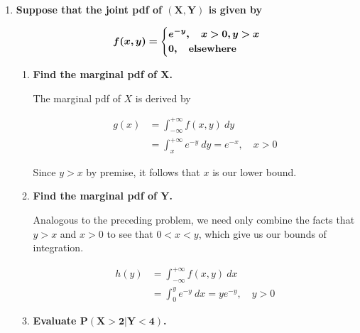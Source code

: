\documentclass[10pt, oneside]{article}
\begin{document}
\begin{enumerate}[label=6.\arabic*]
\item  \begin{tcolorbox}[
  colback=Cerulean!5!white,
  colframe=Cerulean!75!black]
\textbf{Suppose that the joint pdf of $\bm{(X, Y)}$ is given by}

\[ \bm{f(x,y) =} 
\begin{dcases}
\bm{e^{-y},} \quad \bm{x > 0, y > x} \\
\bm{0,} \quad \textbf{elsewhere}
\end{dcases}
\]
\end{tcolorbox}

\begin{enumerate}
	\item  \begin{tcolorbox}[
	  colback=Cerulean!5!white,
	  colframe=Cerulean!75!black]
	\textbf{Find the marginal pdf of $\bm{X}$.}
	\end{tcolorbox}
	
	The marginal pdf of $X$ is derived by
	
	\begin{align*}
	g(x) &= \int^{+\infty}_{-\infty} f(x,y) \ dy \\
	&= \int^{+\infty}_x e^{-y} \ dy = \boxed{e^{-x}, \quad x > 0}
	\end{align*}
	
	Since $y > x$ by premise, it follows that $x$ is our lower bound.
		
	\item  \begin{tcolorbox}[
	  colback=Cerulean!5!white,
	  colframe=Cerulean!75!black]
	\textbf{Find the marginal pdf of $\bm{Y}$.}
	\end{tcolorbox}
	
	Analogous to the preceding problem, we need only combine the facts that $y > x$ and $x > 0$ to see that $0 < x < y$, which give us our bounds of integration.
	
	\begin{align*}
	h(y) &= \int^{+\infty}_{-\infty} f(x,y) \ dx \\
	&= \int^y_0 e^{-y} \ dx = \boxed{y e^{-y}, \quad y > 0}
	\end{align*}
	
	\item  \begin{tcolorbox}[
	  colback=Cerulean!5!white,
	  colframe=Cerulean!75!black]
	\textbf{Evaluate $\bm{P(X > 2 | Y < 4)}$.}
	\end{tcolorbox}
	

\end{enumerate}
\end{enumerate}
\end{document}
